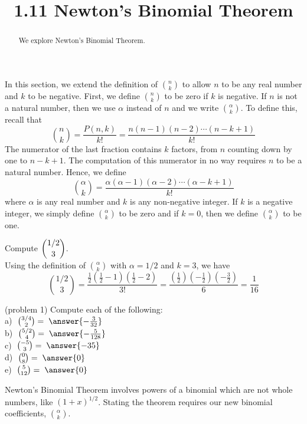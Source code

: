 \documentclass[handout]{ximera}
\title{1.11 Newton's Binomial Theorem}
\begin{document}
\begin{abstract}
We explore Newton's Binomial Theorem.
\end{abstract}

\maketitle


In this section, we extend the definition of $\binom{n}{k}$ to allow $n$ to be any real number and $k$ to be negative.
First, we define $\binom{n}{k}$ to be zero if $k$ is negative. If $n$ is not a natural number, 
then we use $\alpha$ instead of $n$ and we write $\binom{\alpha}{k}$.  To define this, recall that 
\[
\binom{n}{k} = \frac{P(n,k)}{k!} = \frac{n(n-1)(n-2)\cdots(n-k+1)}{k!}
\]
The numerator of the last fraction contains $k$ factors, from $n$ counting down by one to $n-k+1$. 
The computation of this numerator in no way requires $n$ to be a natural number.
Hence, we define 
\[
\binom{\alpha}{k} = \frac{\alpha(\alpha - 1)(\alpha - 2)\cdots(\alpha - k+1)}{k!}
\]
where $\alpha$ is any real number and $k$ is any non-negative integer. If $k$ is a negative integer, we simply define 
$\binom{\alpha}{k}$ to be zero and if $k = 0$, then we define $\binom{\alpha}{k}$ to be one.

\begin{example}[example 1] 
Compute $\displaystyle \binom{1/2}{3}$.\\
Using the definition of $\binom{\alpha}{k}$ with $\alpha = 1/2$ and $k = 3$, we have
\[
\binom{1/2}{3} = \frac{\frac12(\frac12 -1)(\frac12 -2)}{3!} = \frac{\left(\frac12\right) \left(-\frac12\right)\left(-\frac32\right)}{6} = \frac{1}{16}
\]
\end{example}

\begin{problem}(problem 1) Compute each of the following:\\
a) $\; \binom{3/4}{2} = \; \answer{-\frac{3}{32}}$\\
b) $\; \binom{5/2}{4} = \; \answer{-\frac{5}{128}}$\\
c) $\; \binom{-5}{3} = \; \answer{-35}$\\
d) $\; \binom{0}{8} = \; \answer{0}$\\
e) $\; \binom{5}{12} = \; \answer{0}$
\end{problem}

Newton's Binomial Theorem involves powers of a binomial which are not whole numbers, like $(1+x)^{1/2}$. Stating 
the theorem requires our new binomial coefficients, $\binom{\alpha}{k}$.
\end{document}
